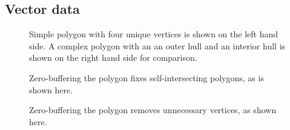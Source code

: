 \subsection{Vector data}

\begin{figure}[htb]
  \centering
  
  \textcolor{gray}{\vrule}
  \hspace{0.01\linewidth}
  
  \caption{
    Simple polygon with four unique vertices is shown on the left hand side.
    A complex polygon with an an outer hull
    and an interior hull is shown on the right hand side for comparison.
  }
\end{figure}

\begin{figure}[H]
  \centering
  
  \caption{Zero-buffering the polygon fixes self-intersecting polygons, as is shown here.}
\end{figure}

\begin{figure}[H]
  \centering
  
  \caption{Zero-buffering the polygon removes unnecessary vertices, as shown here.}
\end{figure}
